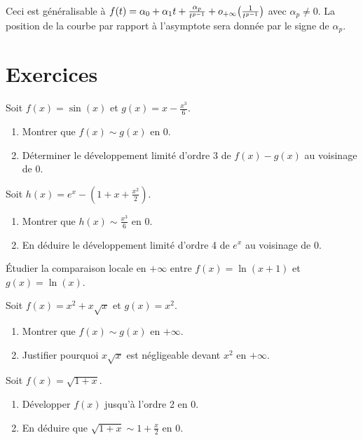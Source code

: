 Ceci est généralisable à \(f(t) = \alpha_0 + \alpha_1 t + 
\frac{\alpha_p}{t^{p-1}} + o\mathopen{}_{+\infty}\left(\frac{1}{t^{p-1}}\right)\) avec 
\(\alpha_p \neq 0\). La position de la courbe par rapport à l'asymptote sera 
donnée par le signe de \(\alpha_p\).
\section{Exercices}
\begin{exercice}
Soit \( f(x) = \sin(x) \) et \( g(x) = x - \frac{x^3}{6} \).
\begin{enumerate}
    \item Montrer que \( f(x) \sim g(x) \) en \( 0 \).
    \item Déterminer le développement limité d'ordre 3 de \( f(x) - g(x) \) au voisinage de \( 0 \).
\end{enumerate}
\end{exercice}

\begin{exercice}
Soit \( h(x) = e^x - (1 + x + \frac{x^2}{2}) \).
\begin{enumerate}
    \item Montrer que \( h(x) \sim \frac{x^3}{6} \) en \( 0 \).
    \item En déduire le développement limité d'ordre 4 de \( e^x \) au voisinage de \( 0 \).
\end{enumerate}
\end{exercice}

\begin{exercice}
Étudier la comparaison locale en \( +\infty \) entre \( f(x) = \ln(x+1) \) et \( g(x) = \ln(x) \).
\end{exercice}

\begin{exercice}
Soit \( f(x) = x^2 + x \sqrt{x} \) et \( g(x) = x^2 \).
\begin{enumerate}
    \item Montrer que \( f(x) \sim g(x) \) en \( +\infty \).
    \item Justifier pourquoi \( x \sqrt{x} \) est négligeable devant \( x^2 \) en \( +\infty \).
\end{enumerate}
\end{exercice}

\begin{exercice}
Soit \( f(x) = \sqrt{1 + x} \).
\begin{enumerate}
    \item Développer \( f(x) \) jusqu'à l'ordre 2 en \( 0 \).
    \item En déduire que \( \sqrt{1+x} \sim 1 + \frac{x}{2} \) en \( 0 \).
\end{enumerate}
\end{exercice}

